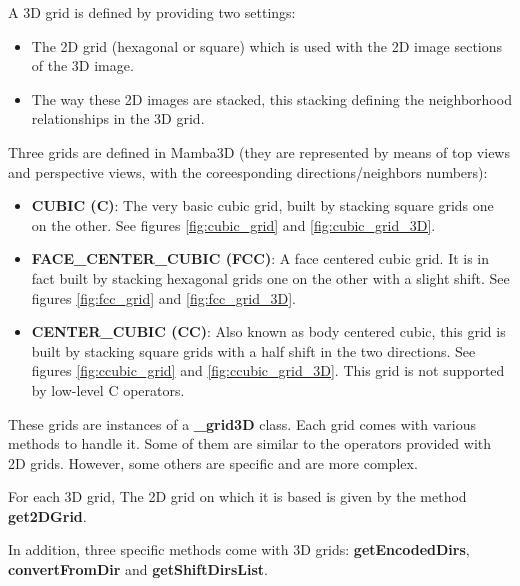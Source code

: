 \documentclass[a4paper,10pt,oneside]{article}
\begin{document}
A 3D grid is defined by providing two settings:

\begin{itemize}
\item The 2D grid (hexagonal or square) which is used with the 2D image sections of the 3D image.
\item The way these 2D images are stacked, this stacking defining the neighborhood relationships in the 3D grid.
\end{itemize}


Three grids are defined in Mamba3D (they are represented by means of top views and perspective views,
with the coreesponding directions/neighbors numbers):

\begin{itemize}
\item \textbf{CUBIC (C)}: The very basic cubic grid, built by stacking square
grids one on the other. See figures \ref{fig:cubic_grid} and \ref{fig:cubic_grid_3D}.
\item \textbf{FACE\_CENTER\_CUBIC (FCC)}: A face centered cubic grid. It is in fact
built by stacking hexagonal grids one on the other with a slight shift. See
figures \ref{fig:fcc_grid} and \ref{fig:fcc_grid_3D}.
\item \textbf{CENTER\_CUBIC (CC)}: Also known as body centered cubic, this grid is
built by stacking square grids with a half shift in the two directions. See
figures \ref{fig:ccubic_grid} and \ref{fig:ccubic_grid_3D}. This grid is not
supported by low-level C operators.
\end{itemize}

These grids are instances of a \textbf{\_grid3D} class. Each grid comes with various
methods to handle it. Some of them are similar to the operators provided with 2D grids.
However, some others are specific and are more complex.

For each 3D grid, The 2D grid on which it is based is given by the method \textbf{get2DGrid}.

In addition, three specific methods come with 3D grids: \textbf{getEncodedDirs}, \textbf{convertFromDir}
and \textbf{getShiftDirsList}.
\end{document}
